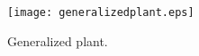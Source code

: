 \begin{figure}[!ht]
  \centering
    \texttt{[image: generalizedplant.eps]}
  \caption{Generalized plant.}
  \label{fig:generalizedplant}
\end{figure}









